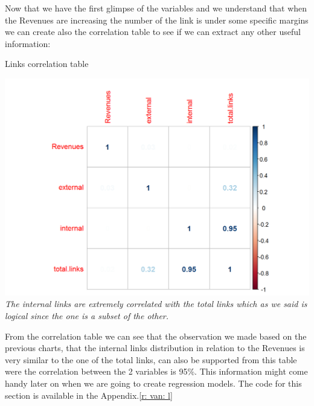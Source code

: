 \documentclass{book}
\begin{document}
Now that we have the first glimpse of the variables and we understand that when the Revenues are increasing the number of the link is under some specific margins we can create also the correlation table to see if we can extract any other useful information:

\begin{table}[H]
\centering
\caption{Links correlation table}
\begin{center}
\includegraphics[scale=0.5]{../R/photos/29_rev_cor_links.png}  \\
\textit{The internal links are extremely correlated with the total links which as we said is logical since the one is a subset of the other.}
\end{center}
\end{table}
From the correlation table we can see that the observation we made based on the previous charts, that the internal links distribution in relation to the Revenues is very similar to the one of the total links, can also be supported from this table were the correlation between the 2 variables is 95\%. This information might come handy later on when we are going to create regression models. The code for this section is available in the Appendix.\ref{r: van: l}
\newpage
\end{document}
